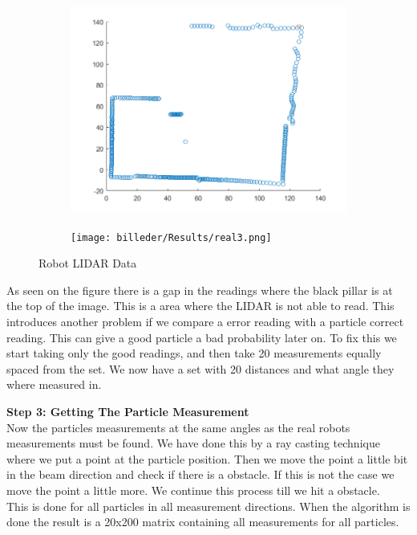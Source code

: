 \begin{figure}[H]
\centering
\begin{subfigure}{.5\textwidth}
  \centering
  \includegraphics[width=1.2\linewidth]{billeder/SeeData.png}
  \label{ResultDriveFig1:sub1}
\end{subfigure}%
\begin{subfigure}{.5\textwidth}
  \centering
  \texttt{[image: billeder/Results/real3.png]}
  \label{ResultDriveFig1:sub2}
\end{subfigure}
\caption{Robot LIDAR Data}
\label{RobotData}
\end{figure}

As seen on the figure there is a gap in the readings where the black pillar is at the top of the image. This is a area where the LIDAR is not able to read. This introduces another problem if we compare a error reading with a particle correct reading. This can give a good particle a bad probability later on.
To fix this we start taking only the good readings, and then take 20 measurements equally spaced from the set. We now have a set with 20 distances and what angle they where measured in. 

\textbf{Step 3: Getting The Particle Measurement}\\
Now the particles measurements at the same angles as the real robots measurements must be found. We have done this by a ray casting technique where we put a point at the particle position. Then we move the point a little bit in the beam direction and check if there is a obstacle. If this is not the case we move the point a little more. We continue this process till we hit a obstacle.\\
This is done for all particles in all measurement directions. When the algorithm is done the result is a 20x200 matrix containing all measurements for all particles. 


